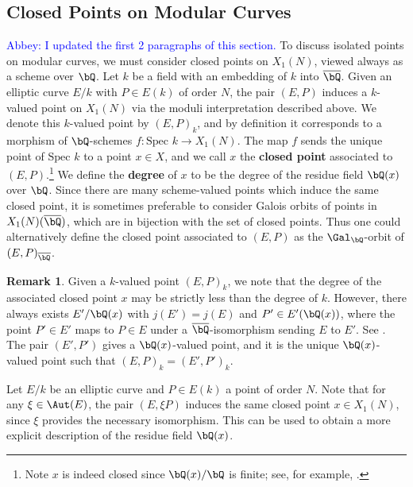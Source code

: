 \documentclass[11pt,reqno]{amsart}
\theoremstyle{plain}
\theoremstyle{definition}
\newtheorem{remark}[theorem]{Remark}
\newcommand{\Q}{\bQ}
\newcommand{\abbey}[1]{\textcolor{blue}{Abbey: #1}}
\begin{document}
\subsection{Closed Points on Modular Curves}\abbey{I updated the first 2 paragraphs of this section.} To discuss isolated points on modular curves, we must consider closed points on $X_1(N)$, viewed always as a scheme over $\Q$. Let $k$ be a field with an embedding of $k$ into $\overline \Q$. Given an elliptic curve $E/k$ with $P \in E(k)$ of order $N$, the pair $(E,P)$ induces a $k$-valued point on $X_1(N)$ via the moduli interpretation described above. We denote this $k$-valued point by $(E,P)_k$, and by definition it corresponds to a morphism of $\Q$-schemes $f:\text{Spec } k \rightarrow X_1(N)$. The map $f$ sends the unique point of $\text{Spec } k$ to a point $x \in X$, and we call $x$ the \textbf{closed point} associated to $(E,P)$.\footnote{Note $x$ is indeed closed since $\Q(x)/\Q$ is finite; see, for example, \cite[Exercise 5.9, p.76] {Liu2002}.} We define the \textbf{degree} of $x$ to be the degree of the residue field $\Q(x)$ over $\Q$. Since there are many scheme-valued points which induce the same closed point, it is sometimes preferable to consider Galois orbits of points in $X_1(N)(\overline{\Q})$, which are in bijection with the set of closed points. Thus one could alternatively define the closed point associated to $(E,P)$ as the $\Gal_\Q$-orbit of $(E,P)_{\overline{\Q}}$. 

\begin{remark} Given a $k$-valued point $(E,P)_k$, we note that the degree of the associated closed point $x$ may be strictly less than the degree of $k$. However, there always exists $E'/\Q(x)$ with $j(E')=j(E)$ and $P' \in E'(\Q(x))$, where the point $P' \in E'$ maps to $P \in E$ under a $\overline \Q$-isomorphism sending $E$ to $E'$. See \cite[p. 274, Proposition VI.3.2]{DR}. The pair $(E',P')$ gives a $\Q(x)$-valued point, and it is the unique $\Q(x)$-valued point such that $(E,P)_{k}=(E',P')_{k}.$
\end{remark}

Let $E/k$ be an elliptic curve and $P \in E(k)$ a point of order $N$. Note that for any $\xi \in \Aut(E)$, the pair $(E,\xi P)$ induces the same closed point $x \in X_1(N)$, since $\xi$ provides the necessary isomorphism. This can be used to obtain a more explicit description of the residue field $\Q(x)$.
\end{document}
